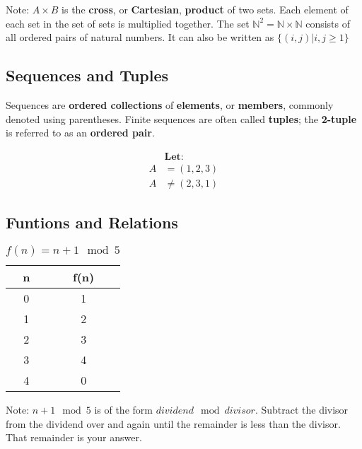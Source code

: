 Note: $A \times B$ is the \textbf{cross}, or \textbf{Cartesian}, \textbf{product} of two sets. Each element of each set 
in the set of sets is multiplied together. The set $\mathbb{N}^2 = \mathbb{N} \times \mathbb{N}$ consists of all ordered pairs of natural numbers. It can 
also be written as $\{(i, j)|i, j \geq 1\}$

\subsection{Sequences and Tuples}

\hspace{2em} Sequences are \textbf{ordered collections} of \textbf{elements}, or \textbf{members}, commonly denoted using parentheses.
Finite sequences are often called \textbf{tuples}; the \textbf{2-tuple} is referred to as an \textbf{ordered pair}.

\begin{center}
    \begin{minipage}{0.5\textwidth}
    \begin{align*}
        &\textbf{Let:}\\
        A &= (1, 2, 3)\\
        A &\neq (2, 3, 1)
    \end{align*}
    \end{minipage}
\end{center}

\subsection{Funtions and Relations}

\begin{table}[H]
    \centering
    \begin{tabular}{| c | c |}
        \hline
        n & f(n)\\
        \hline
        0 & 1\\
        1 & 2\\
        2 & 3\\
        3 & 4\\
        4 & 0\\
        \hline
    \end{tabular}
    \caption{$f(n) = n + 1 \mod 5$}
    \label{table:1}
\end{table}

Note: $n + 1 \mod 5$ is of the form $dividend \mod divisor$. Subtract the divisor from the dividend over and again until the remainder
is less than the divisor. That remainder is your answer.

